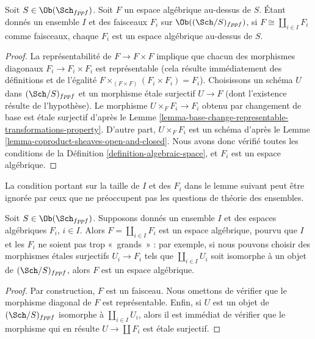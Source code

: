 \begin{lemma}
\label{lemma-algebraic-space-coproduct-sheaves}
Soit $S \in \Ob(\Sch_{fppf})$.
Soit $F$ un espace algébrique au-dessus de $S$.
Étant donnés un ensemble $I$ et des faisceaux $F_i$ sur
$\Ob((\Sch/S)_{fppf})$,
si $F \cong \coprod_{i\in I} F_i$ comme faisceaux,
chaque $F_i$ est un espace algébrique au-dessus de $S$.
\end{lemma}

\begin{proof}
La représentabilité de $F \to F \times F$ implique que chacun des morphismes diagonaux
$F_i \to F_i \times F_i$ est représentable (cela résulte immédiatement des définitions
et de l'égalité $F \times_{(F \times F)} (F_i \times F_i) = F_i$).
Choisissons un schéma $U$ dans $(\Sch/S)_{fppf}$ et un morphisme
\'etale surjectif $U \to F$ (dont l'existence résulte de l'hypothèse).
Le morphisme $U \times_F F_i \to F_i$ obtenu par changement de base est \'etale surjectif
d'après le Lemme \ref{lemma-base-change-representable-transformations-property}.
D'autre part, $U \times_F F_i$ est un schéma d'après le
Lemme \ref{lemma-coproduct-sheaves-open-and-closed}.
Nous avons donc vérifié toutes les conditions de la
Définition \ref{definition-algebraic-space},
et $F_i$ est un espace algébrique.
\end{proof}

\noindent
La condition portant sur la taille de $I$ et des $F_i$ dans le
lemme suivant peut être ignorée par ceux que ne préoccupent pas les
questions de théorie des ensembles.

\begin{lemma}
\label{lemma-coproduct-algebraic-spaces}
Soit $S \in \Ob(\Sch_{fppf})$.
Supposons donnés un ensemble $I$ et des espaces algébriques $F_i$, $i \in I$.
Alors $F = \coprod_{i \in I} F_i$ est un espace algébrique,
pourvu que $I$ et les $F_i$ ne soient pas trop «~grands~» : par exemple, si nous
pouvons choisir des morphismes \'etales surjectifs $U_i \to F_i$ tels que
$\coprod_{i \in I} U_i$ soit isomorphe à un objet de
$(\Sch/S)_{fppf}$, alors $F$ est un espace algébrique.
\end{lemma}

\begin{proof}
Par construction, $F$ est un faisceau. Nous omettons de vérifier que le
morphisme diagonal de $F$ est représentable. Enfin, si $U$ est un
objet de $(\Sch/S)_{fppf}$ isomorphe à $\coprod_{i \in I} U_i$,
alors il est immédiat de vérifier que le morphisme qui en résulte
$U \to \coprod F_i$ est \'etale surjectif.
\end{proof}

